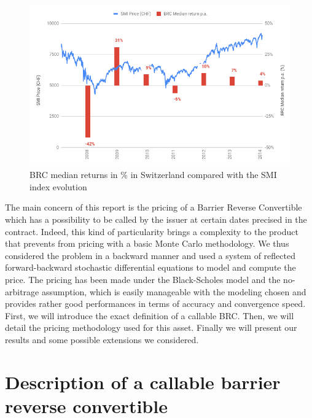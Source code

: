 \documentclass[a4paper,11pt,english]{book}
\begin{document}
\begin{figure}[H] 
    \centering
    \includegraphics[scale=0.45]{images/BRC_median_return.png} 
    \caption{BRC median returns in \% in Switzerland compared with the SMI index evolution}
    \label{fig:median-returns-BRC}
\end{figure}

The main concern of this report is the pricing of a Barrier Reverse Convertible which has a possibility to be called by the issuer at certain dates precised in the contract. Indeed, this kind of particularity brings a complexity to the product that prevents from pricing with a basic Monte Carlo methodology. We thus considered the problem in a backward manner and used a system of reflected forward-backward stochastic differential equations to model and compute the price. The pricing has been made under the Black-Scholes model and the no-arbitrage assumption, which is easily manageable with the modeling chosen and provides rather good performances in terms of accuracy and convergence speed. \\

First, we will introduce the exact definition of a callable BRC. Then, we will detail the pricing methodology used for this asset. Finally we will present our results and some possible extensions we considered.  




\pagestyle{fancy}

\chapter{Description of a callable barrier reverse convertible}
\end{document}
